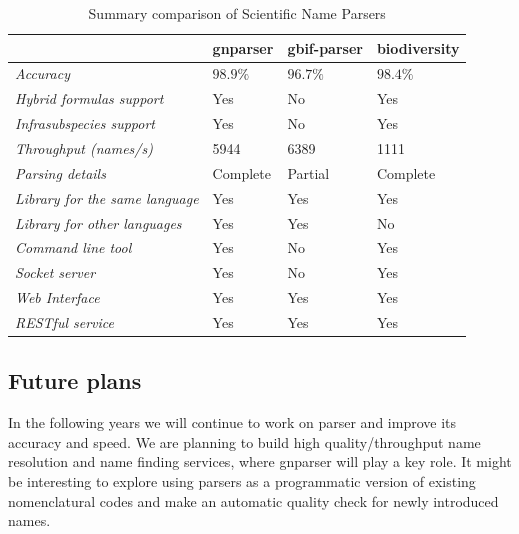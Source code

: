 \documentclass{bmcart}
\begin{document}
\begin{table}[htb]
  \begin{center}
    \caption{Summary comparison of Scientific Name Parsers}
    \label{table:summary}
    \resizebox{12.5cm}{!} {
    \begin{tabular}{|l|*{3}{l}|}
      \hline
                             & gnparser & gbif-parser & biodiversity \\
      \hline
      \textit{Accuracy}                     & $98.9\%$ & $96.7\%$ & $98.4\%$\\
      \textit{Hybrid formulas support}      & Yes      & No       & Yes     \\
      \textit{Infrasubspecies support}      & Yes      & No       & Yes     \\
      \textit{Throughput (names/s)}         & 5944     & 6389     & 1111    \\
      \textit{Parsing details}              & Complete & Partial  & Complete\\
      \textit{Library for the same language}& Yes      & Yes      & Yes     \\
      \textit{Library for other languages}  & Yes      & Yes      & No      \\
      \textit{Command line tool}            & Yes      & No       & Yes     \\
      \textit{Socket server}                & Yes      & No       & Yes     \\
      \textit{Web Interface}                & Yes      & Yes      & Yes     \\
      \textit{RESTful service}              & Yes      & Yes      & Yes     \\
      \hline
    \end{tabular}
  }
  \end{center}
\end{table}

\subsection*{Future plans}

In the following years we will continue to work on parser and improve its
accuracy and speed. We are planning to build high quality/throughput name
resolution and name finding services, where gnparser will play a key role.
It might be interesting to explore using parsers as a programmatic version
of existing nomenclatural codes and make an automatic quality check for newly
introduced names.
\end{document}
